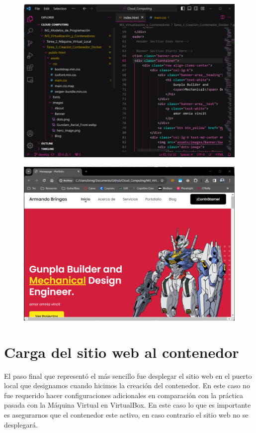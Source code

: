 \documentclass[12pt,a4paper]{article}
\begin{document}
\begin{figure}[H]
    \centering
    \includegraphics[width=.75\linewidth]{M3_Virtualización_y_Contenedores/Tarea_3_Creación_Contenedor_Docker/reporte/figuras/5-1_Personalización_Sitio_Web.png}
    \label{fig:Personalización_web_1}
\end{figure}

\begin{figure}[H]
    \centering
    \includegraphics[width=.75\linewidth]{M3_Virtualización_y_Contenedores/Tarea_3_Creación_Contenedor_Docker/reporte/figuras/5-2_Personalización_Sitio_Web.png}
    \label{fig:Personalización_web_2}
\end{figure}


\section{Carga del sitio web al contenedor}

El paso final que representó el más sencillo fue desplegar el sitio web en el puerto local  que designamos cuando hicimos la creación del contenedor. En este caso no fue requerido hacer configuraciones adicionales en comparación con la práctica pasada con la Máquina Virtual en VirtualBox. En este caso lo que es importante es asegurarnos que el contenedor este activo, en caso contrario el sitio web no se desplegará.
\end{document}
